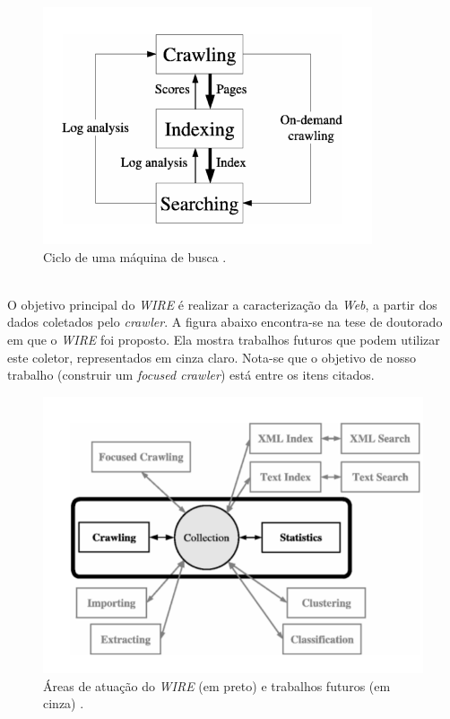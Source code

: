 \documentclass[a4paper,12pt,titlepage]{article}
\begin{document}
\begin{figure}[H]
     \centering
     \includegraphics[scale=0.2]{figures/search-engine-cycle.png}
     \caption{Ciclo de uma máquina de busca \cite{carlos}.}
     \label{bsp}
\end{figure}

\ \\

O objetivo principal do \textit{WIRE} é realizar a caracterização da \textit{Web}, a partir dos dados coletados pelo \textit{crawler}. A figura abaixo encontra-se na tese de doutorado em que o \textit{WIRE} foi proposto. Ela mostra trabalhos futuros que podem utilizar este coletor, representados em cinza claro. Nota-se que o objetivo de nosso trabalho (construir um \textit{focused crawler}) está entre os itens citados.

\begin{figure}[H]
     \centering
     \includegraphics[scale=0.4]{figures/wire-architecture.png}
     \caption{Áreas de atuação do \textit{WIRE} (em preto) e trabalhos futuros (em cinza) \cite{carlos}.}
     \label{bsp}
\end{figure}
\end{document}

